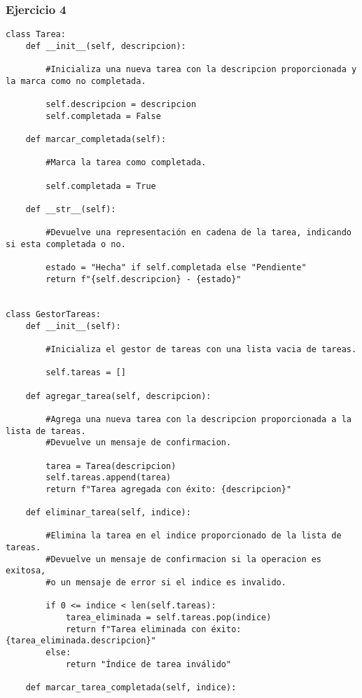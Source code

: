 \documentclass[10pt,a4paper]{article}
\begin{document}
\subsubsection{Ejercicio 4}
\begin{lstlisting}
class Tarea:
    def __init__(self, descripcion):
    
        #Inicializa una nueva tarea con la descripcion proporcionada y la marca como no completada.
        
        self.descripcion = descripcion
        self.completada = False

    def marcar_completada(self):
        
        #Marca la tarea como completada.
        
        self.completada = True

    def __str__(self):
        
        #Devuelve una representación en cadena de la tarea, indicando si esta completada o no.
        
        estado = "Hecha" if self.completada else "Pendiente"
        return f"{self.descripcion} - {estado}"


class GestorTareas:
    def __init__(self):
        
        #Inicializa el gestor de tareas con una lista vacia de tareas.
        
        self.tareas = []

    def agregar_tarea(self, descripcion):
        
        #Agrega una nueva tarea con la descripcion proporcionada a la lista de tareas.
        #Devuelve un mensaje de confirmacion.
    
        tarea = Tarea(descripcion)
        self.tareas.append(tarea)
        return f"Tarea agregada con éxito: {descripcion}"

    def eliminar_tarea(self, indice):
        
        #Elimina la tarea en el indice proporcionado de la lista de tareas.
        #Devuelve un mensaje de confirmacion si la operacion es exitosa,
        #o un mensaje de error si el indice es invalido.
        
        if 0 <= indice < len(self.tareas):
            tarea_eliminada = self.tareas.pop(indice)
            return f"Tarea eliminada con éxito: {tarea_eliminada.descripcion}"
        else:
            return "Índice de tarea inválido"

    def marcar_tarea_completada(self, indice):
        

\end{lstlisting}
\end{document}
